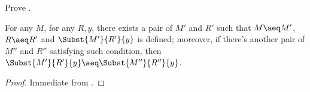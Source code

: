 \documentclass[../../../include/open-logic-section]{subfiles}
\begin{document}
\begin{prob}
  Prove .
\end{prob}

\begin{cor}
  For any $M$, for any $R, y$, there exists a pair of $M'$ and $R'$
  such that $M \aeq M'$, $R \aeq R'$ and $\Subst{M'}{R'}{y}$ is defined; moreover,
  if there's another pair of
  $M''$ and $R''$ satisfying such condition, then $\Subst{M'}{R'}{y} \aeq \Subst{M''}{R''}{y}$.
\end{cor}
\begin{proof}
  Immediate from .
\end{proof}
\end{document}
